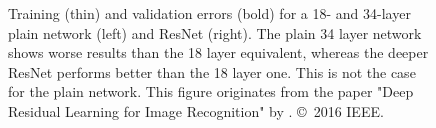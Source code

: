 \begin{figure}
	\caption{
		Training (thin) and validation errors (bold) for a 18- and 34-layer plain network (left) and ResNet (right).
		The plain 34 layer network shows worse results than the 18 layer equivalent, whereas the deeper ResNet performs better than the 18 layer one.
		This is not the case for the plain network.
		This figure originates from the paper "Deep Residual Learning for Image Recognition" by \citet{he16}. \copyright~2016 IEEE.}
	\label{fig:depth-performance-decline}
\end{figure}